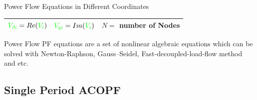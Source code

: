 \documentclass{beamer}
\begin{document}
\begin{frame}{Power Flow Equations in Different Coordinates}
{{\begin{center}
\begin{tabular}{|c c|}
$ \textcolor {green}{V_{di}}= Re (\textcolor {green}{V_i})$ \  $ \textcolor {green}{V_{qi}}= Im (\textcolor {green}{V_i})$& $N=$ number of Nodes\\
  \hline
\end{tabular}
\end{center}}}
 {\scriptsize \begin{block}{Power Flow}
PF equations are a set of nonlinear algebraic equations which can be solved with Newton-Raphson, Gauss–Seidel, Fast-decoupled-load-flow method and etc.
\end{block}}

\end{frame}

\subsection{Single Period ACOPF}
\end{document}

